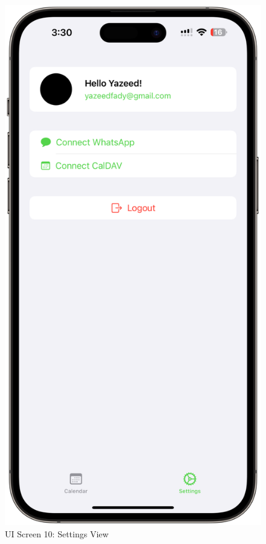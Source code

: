 \begin{figure}[!h]
\begin{minipage}{0.3\textwidth}
        \includegraphics[width=\textwidth]{images/screen10.png}
        \caption{UI Screen 10: Settings View}
        \label{fig:ui-screen-10}
    \end{minipage}
\end{figure}